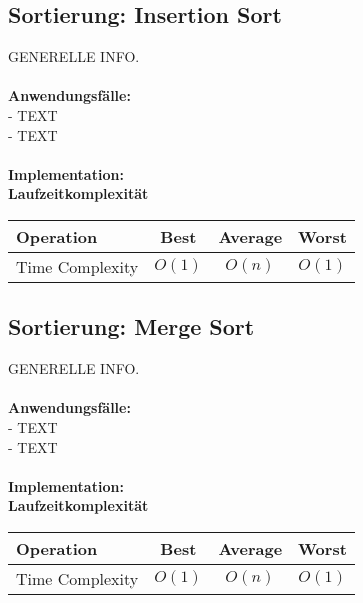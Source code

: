 \documentclass[../main.tex]{subfiles}
\begin{document}
	\subsection{Sortierung: Insertion Sort}
	GENERELLE INFO. \\\\
	\textbf{Anwendungsfälle:}\\
	- TEXT\\
	- TEXT\\\\
	\textbf{Implementation:}\\
	 
	\textbf{Laufzeitkomplexität}\\
	\begin{table}[ht]
		\centering
		\begin{tabular}{l *{3}{c}}
			\toprule
			Operation & Best & Average & Worst\\
			\midrule
			Time Complexity & $O(1)$ & $O(n)$ & $O(1)$\\
			\bottomrule
		\end{tabular}
	\end{table}
	\clearpage
	
	\subsection{Sortierung: Merge Sort}
	GENERELLE INFO. \\\\
	\textbf{Anwendungsfälle:}\\
	- TEXT\\
	- TEXT\\\\
	\textbf{Implementation:}\\
	 
	\textbf{Laufzeitkomplexität}\\
	\begin{table}[ht]
		\centering
		\begin{tabular}{l *{3}{c}}
			\toprule
			Operation & Best & Average & Worst\\
			\midrule
			Time Complexity & $O(1)$ & $O(n)$ & $O(1)$\\
			\bottomrule
		\end{tabular}
	\end{table}
	\clearpage
	
\end{document}
